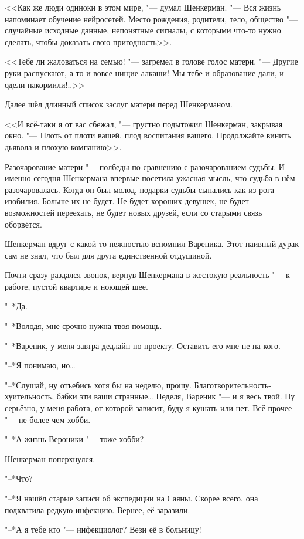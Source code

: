 <<Как же люди одиноки в этом мире, "--- думал Шенкерман.
"--- Вся жизнь напоминает обучение нейросетей.
Место рождения, родители, тело, общество "--- случайные исходные данные, непонятные сигналы, с которыми что-то нужно сделать, чтобы доказать свою пригодность>>.

<<Тебе ли жаловаться на семью! "--- загремел в голове голос матери.
"--- Другие руки распускают, а то и вовсе нищие алкаши!
Мы тебе и образование дали, и одели-накормили!..>>

Далее шёл длинный список заслуг матери перед Шенкерманом.

<<И всё-таки я от вас сбежал, "--- грустно подытожил Шенкерман, закрывая окно.
"--- Плоть от плоти вашей, плод воспитания вашего.
Продолжайте винить дьявола и плохую компанию>>.

Разочарование матери "--- полбеды по сравнению с разочарованием судьбы.
И именно сегодня Шенкермана впервые посетила ужасная мысль, что судьба в нём разочаровалась.
Когда он был молод, подарки судьбы сыпались как из рога изобилия.
Больше их не будет.
Не будет хороших девушек, не будет возможностей переехать, не будет новых друзей, если со старыми связь оборвётся.

Шенкерман вдруг с какой-то нежностью вспомнил Вареника.
Этот наивный дурак сам не знал, что был для друга единственной отдушиной.

Почти сразу раздался звонок, вернув Шенкермана в жестокую реальность "--- к работе, пустой квартире и ноющей шее.

"--*Да.

"--*Володя, мне срочно нужна твоя помощь.

"--*Вареник, у меня завтра дедлайн по проекту.
Оставить его мне не на кого.

"--*Я понимаю, но\ldots{}

"--*Слушай, ну отъебись хотя бы на неделю, прошу.
Благотворительность-хуительность, бабки эти ваши странные\ldots{}
Неделя, Вареник "--- и я весь твой.
Ну серьёзно, у меня работа, от которой зависит, буду я кушать или нет.
Всё прочее "--- не более чем хобби.

"--*А жизнь Вероники "--- тоже хобби?

Шенкерман поперхнулся.

"--*Что?

"--*Я нашёл старые записи об экспедиции на Саяны.
Скорее всего, она подхватила редкую инфекцию.
Вернее, её заразили.

"--*А я тебе кто "--- инфекциолог?
Вези её в больницу!

